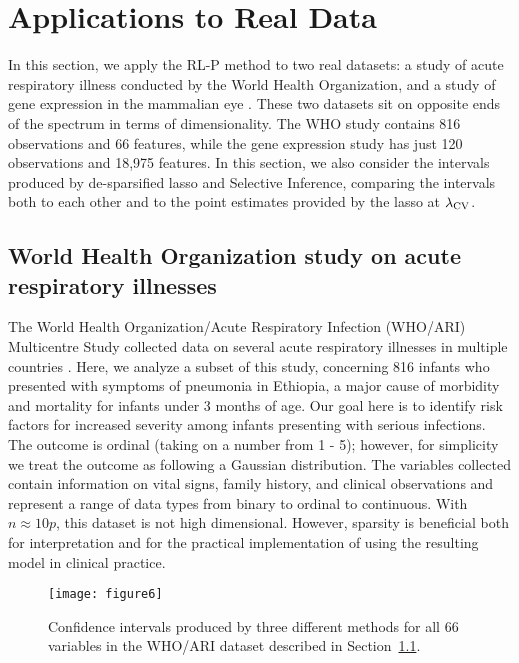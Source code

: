\section{Applications to Real Data}\label{Sec:RDA}

In this section, we apply the RL-P method to two real datasets: a study of acute respiratory illness conducted by the World Health Organization, and a study of gene expression in the mammalian eye \citep{Scheetz2006}. These two datasets sit on opposite ends of the spectrum in terms of dimensionality. The WHO study contains 816 observations and 66 features, while the gene expression study has just 120 observations and 18,975 features. In this section, we also consider the intervals produced by de-sparsified lasso and Selective Inference, comparing the intervals both to each other and to the point estimates provided by the lasso at $\lambda_{\textrm{CV}}$.

\subsection{World Health Organization study on acute respiratory illnesses}\label{Sec:WHO-ARI}

The World Health Organization/Acute Respiratory Infection (WHO/ARI) Multicentre Study collected data on several acute respiratory illnesses in multiple countries \citep{Harrell1998}. Here, we analyze a subset of this study, concerning 816 infants who presented with symptoms of pneumonia in Ethiopia, a major cause of morbidity and mortality for infants under 3 months of age. Our goal here is to identify risk factors for increased severity among infants presenting with serious infections. The outcome is ordinal (taking on a number from 1 - 5); however, for simplicity we treat the outcome as following a Gaussian distribution. The variables collected contain information on vital signs, family history, and clinical observations and represent a range of data types from binary to ordinal to continuous. With $n \approx 10p$, this dataset is not high dimensional. However, sparsity is beneficial both for interpretation and for the practical implementation of using the resulting model in clinical practice.

\begin{figure}[htb!]
  \begin{center}
    \texttt{[image: figure6]}
    \caption{\label{fig:6} Confidence intervals produced by three different methods for all 66 variables in the WHO/ARI dataset described in Section~\ref{Sec:WHO-ARI}.}
  \end{center}
\end{figure}

